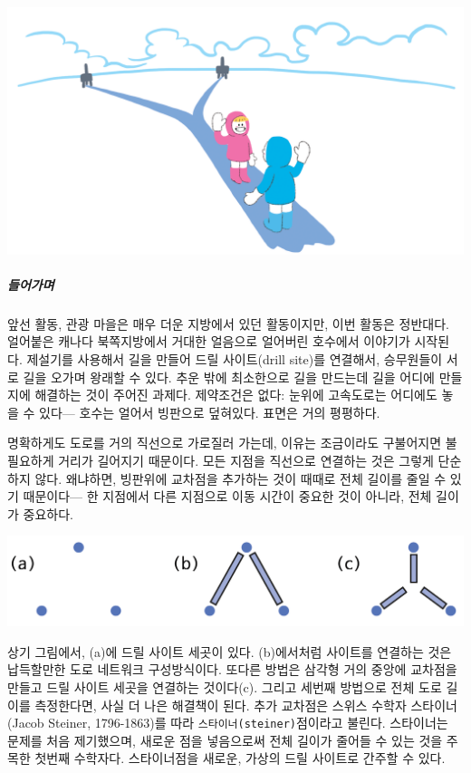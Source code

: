 \documentclass[]{article}
\begin{document}
\includegraphics{csunplugged/04-part/img/ch16-steiner/15-steiner-01-ice-roads.png}

\subparagraph{들어가며}\label{section-215}

앞선 활동, 관광 마을은 매우 더운 지방에서 있던 활동이지만, 이번 활동은
정반대다. 얼어붙은 캐나다 북쪽지방에서 거대한 얼음으로 얼어버린 호수에서
이야기가 시작된다. 제설기를 사용해서 길을 만들어 드릴 사이트(drill
site)를 연결해서, 승무원들이 서로 길을 오가며 왕래할 수 있다. 추운 밖에
최소한으로 길을 만드는데 길을 어디에 만들지에 해결하는 것이 주어진
과제다. 제약조건은 없다: 눈위에 고속도로는 어디에도 놓을 수 있다---
호수는 얼어서 빙판으로 덮혀있다. 표면은 거의 평평하다.

명확하게도 도로를 거의 직선으로 가로질러 가는데, 이유는 조금이라도
구불어지면 불필요하게 거리가 길어지기 때문이다. 모든 지점을 직선으로
연결하는 것은 그렇게 단순하지 않다. 왜냐하면, 빙판위에 교차점을 추가하는
것이 때때로 전체 길이를 줄일 수 있기 때문이다--- 한 지점에서 다른
지점으로 이동 시간이 중요한 것이 아니라, 전체 길이가 중요하다.

\includegraphics{csunplugged/04-part/img/ch16-steiner/15-steiner-02-three-sites.png}

상기 그림에서, (a)에 드릴 사이트 세곳이 있다. (b)에서처럼 사이트를
연결하는 것은 납득할만한 도로 네트워크 구성방식이다. 또다른 방법은
삼각형 거의 중앙에 교차점을 만들고 드릴 사이트 세곳을 연결하는
것이다(c). 그리고 세번째 방법으로 전체 도로 길이를 측정한다면, 사실 더
나은 해결책이 된다. 추가 교차점은 스위스 수학자 스타이너(Jacob Steiner,
1796-1863)를 따라 \texttt{스타이너(steiner)}점이라고 불린다. 스타이너는
문제를 처음 제기했으며, 새로운 점을 넣음으로써 전체 길이가 줄어들 수
있는 것을 주목한 첫번째 수학자다. 스타이너점을 새로운, 가상의 드릴
사이트로 간주할 수 있다.
\end{document}
